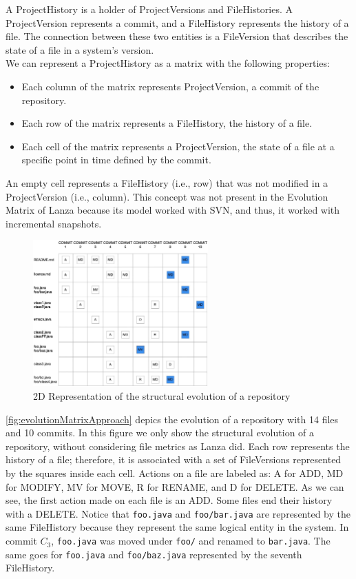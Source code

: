 A ProjectHistory is a holder of ProjectVersions and FileHistories. 
A ProjectVersion represents a commit, and a FileHistory represents the history of a file. 
The connection between these two entities is a FileVersion that describes the state of a file in a system's version. \\
We can represent a ProjectHistory as a matrix with the following properties: 
\begin{itemize}
    \item Each column of the matrix represents ProjectVersion, a commit of the repository. 
    \item Each row of the matrix represents a FileHistory, the history of a file. 
    \item Each cell of the matrix represents a ProjectVersion, the state of a file at a specific point in time defined by the commit. 
\end{itemize}

An empty cell represents a FileHistory (i.e., row) that was not modified in a ProjectVersion (i.e., column). 
This concept was not present in the Evolution Matrix of Lanza because its model worked with SVN, and thus, it worked with incremental snapshots.  

\begin{figure}[h]
    \center
    \includegraphics[width=0.6\textwidth]{2DMatrix.jpg}
    \caption{2D Representation of the structural evolution of a repository}
    \label{fig:evolutionMatrixApproach}
\end{figure}
\autoref{fig:evolutionMatrixApproach} depics the evolution of a repository with 14 files and 10 commits. In this figure we only show the structural evolution of a repository, without considering file metrics as Lanza did. 
Each row represents the history of a file; therefore, it is associated with a set of FileVersions represented by the squares inside each cell. Actions on a file are labeled as: A for ADD, MD for MODIFY, MV for MOVE, R for RENAME, and D for DELETE.
As we can see, the first action made on each file is an ADD. Some files end their history with a DELETE. Notice that \texttt{foo.java} and \texttt{foo/bar.java} are represented by the same FileHistory because they represent the same logical entity in the system. 
In commit $C_3$, \texttt{foo.java} was moved under \texttt{foo/} and renamed to  \texttt{bar.java}.
The same goes for \texttt{foo.java} and \texttt{foo/baz.java} represented by the seventh FileHistory.

